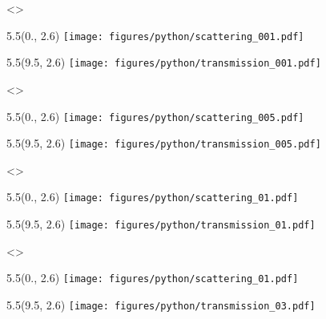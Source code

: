 \def \SPECTRUMWIDTH {5.5}
\def \SPECTRUMY {2.6}
\def \SCASPECTRUMX {0.}
\def \TRASPECTRUMX {9.5}

\visible<\SLIDERESOLUTIONONE>{
    \begin{textblock}{\SPECTRUMWIDTH}(\SCASPECTRUMX, \SPECTRUMY)
        \texttt{[image: figures/python/scattering\_001.pdf]}
    \end{textblock}

    \begin{textblock}{\SPECTRUMWIDTH}(\TRASPECTRUMX, \SPECTRUMY)
        \texttt{[image: figures/python/transmission\_001.pdf]}
    \end{textblock}
}

\visible<\SLIDERESOLUTIONTWO>{
    \begin{textblock}{\SPECTRUMWIDTH}(\SCASPECTRUMX, \SPECTRUMY)
        \texttt{[image: figures/python/scattering\_005.pdf]}
    \end{textblock}

    \begin{textblock}{\SPECTRUMWIDTH}(\TRASPECTRUMX, \SPECTRUMY)
        \texttt{[image: figures/python/transmission\_005.pdf]}
    \end{textblock}
}

\visible<\SLIDERESOLUTIONTHREE>{
    \begin{textblock}{\SPECTRUMWIDTH}(\SCASPECTRUMX, \SPECTRUMY)
        \texttt{[image: figures/python/scattering\_01.pdf]}
    \end{textblock}

    \begin{textblock}{\SPECTRUMWIDTH}(\TRASPECTRUMX, \SPECTRUMY)
        \texttt{[image: figures/python/transmission\_01.pdf]}
    \end{textblock}
}

\visible<\SLIDERESOLUTIONFOUR>{
    \begin{textblock}{\SPECTRUMWIDTH}(\SCASPECTRUMX, \SPECTRUMY)
        \texttt{[image: figures/python/scattering\_01.pdf]}
    \end{textblock}

    \begin{textblock}{\SPECTRUMWIDTH}(\TRASPECTRUMX, \SPECTRUMY)
        \texttt{[image: figures/python/transmission\_03.pdf]}
    \end{textblock}
}